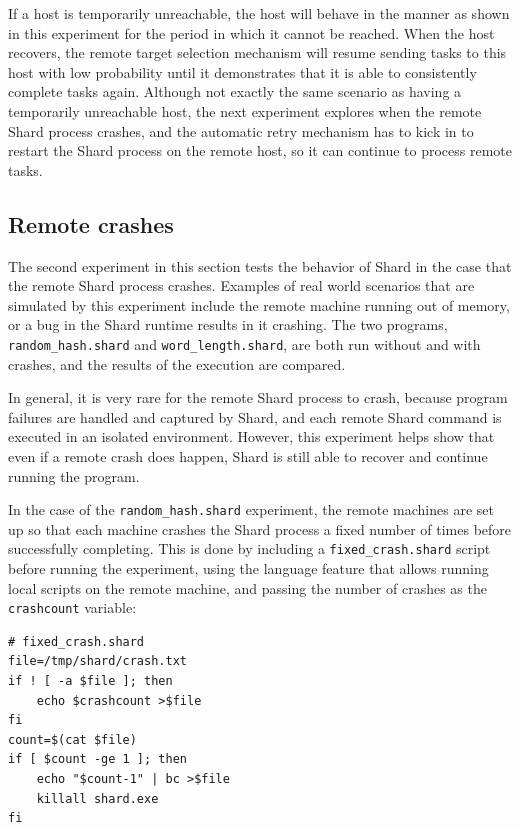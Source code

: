 \documentclass[twoside]{report}
\begin{document}
If a host is temporarily unreachable, the host will behave in the manner as shown in this experiment for the period in which it cannot be reached. When the host recovers, the remote target selection mechanism will resume sending tasks to this host with low probability until it demonstrates that it is able to consistently complete tasks again.
Although not exactly the same scenario as having a temporarily unreachable host, the next experiment explores when the remote Shard process crashes, and the automatic retry mechanism has to kick in to restart the Shard process on the remote host, so it can continue to process remote tasks.

\subsection{Remote crashes}
The second experiment in this section tests the behavior of Shard in the case that the remote Shard process crashes.
Examples of real world scenarios that are simulated by this experiment include the remote machine running out of memory, or a bug in the Shard runtime results in it crashing.
The two programs, \texttt{random\_hash.shard} and \texttt{word\_length.shard}, are both run without and with crashes, and the results of the execution are compared.

In general, it is very rare for the remote Shard process to crash, because program failures are handled and captured by Shard, and each remote Shard command is executed in an isolated environment.
However, this experiment helps show that even if a remote crash does happen, Shard is still able to recover and continue running the program.

In the case of the \texttt{random\_hash.shard} experiment, the remote machines are set up so that each machine crashes the Shard process a fixed number of times before successfully completing.
This is done by including a \texttt{fixed\_crash.shard} script before running the experiment, using the language feature that allows running local scripts on the remote machine, and passing the number of crashes as the \texttt{crashcount} variable:

\begin{minipage}[c]{\textwidth-15pt}
  \begin{lstlisting}[language=Shard]
# fixed_crash.shard
file=/tmp/shard/crash.txt
if ! [ -a $file ]; then
    echo $crashcount >$file
fi
count=$(cat $file)
if [ $count -ge 1 ]; then
    echo "$count-1" | bc >$file
    killall shard.exe
fi
\end{lstlisting}
  \smallskip
\end{minipage}
\end{document}
